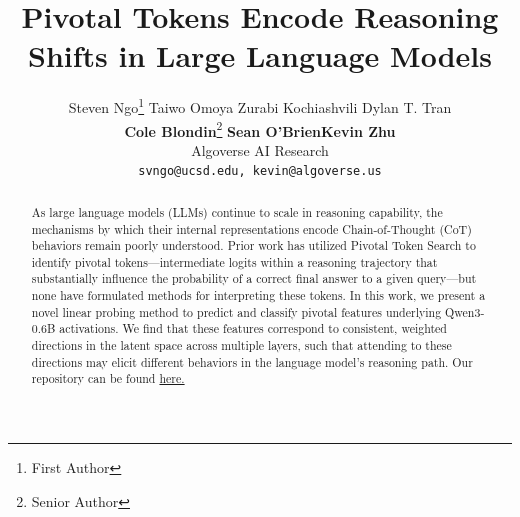\documentclass[11pt]{article}
\title{Pivotal Tokens Encode Reasoning Shifts in Large Language Models}
\author{%
Steven Ngo\thanks{First Author} \quad Taiwo Omoya \quad Zurabi Kochiashvili \quad Dylan T. Tran \quad \\
\textbf{Cole Blondin}\thanks{Senior Author} \quad \textbf{Sean O'Brien}\footnotemark[2] \quad \textbf{Kevin Zhu}\footnotemark[2]
\\
Algoverse AI Research\\
\texttt{svngo@ucsd.edu, kevin@algoverse.us}
}
\begin{document}
\maketitle
\begin{abstract}

As large language models (LLMs) continue to scale in reasoning capability, the mechanisms by which their internal representations encode Chain-of-Thought (CoT) behaviors remain poorly understood. Prior work has utilized Pivotal Token Search to identify pivotal tokens—intermediate logits within a reasoning trajectory that substantially influence the probability of a correct final answer to a given query—but none have formulated methods for interpreting these tokens. In this work, we present a novel linear probing method to predict and classify pivotal features underlying Qwen3-0.6B activations. We find that these features correspond to consistent, weighted directions in the latent space across multiple layers, such that attending to these directions may elicit different behaviors in the language model's reasoning path. Our repository can be found \href{https://github.com/stvngo/Algoverse-AI-Model-Probing}{here.}

\end{abstract}
\end{document}

